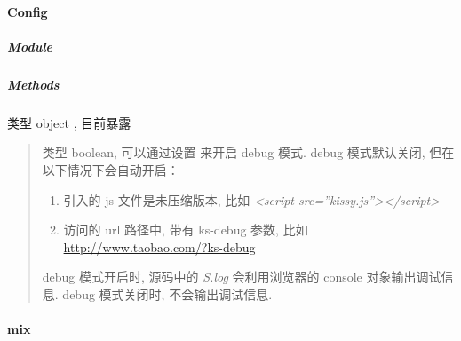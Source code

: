 \documentclass[letterpaper,10pt,english]{sphinxmanual}
\begin{document}
\paragraph{Config}
\label{api/seed/kissy/Config:config}\label{api/seed/kissy/Config::doc}

\subparagraph{Module}
\label{api/seed/kissy/Config:module}\begin{quote}

{\hyperref[api/seed/kissy/index:module-Seed]{}}
\end{quote}


\subparagraph{Methods}
\label{api/seed/kissy/Config:methods}

\begin{fulllineitems}
\label{api/seed/kissy/Config:Seed.KISSY.Config}
类型 object , 目前暴露
\begin{quote}


\begin{fulllineitems}
\label{api/seed/kissy/Config:Seed.KISSY.Config.debug}
类型 boolean, 可以通过设置  来开启 debug 模式.
debug 模式默认关闭, 但在以下情况下会自动开启：
\begin{enumerate}
\item {}
引入的 js 文件是未压缩版本, 比如 \emph{\textless{}script src=''kissy.js''\textgreater{}\textless{}/script\textgreater{}}

\item {}
访问的 url 路径中, 带有 ks-debug 参数, 比如 \href{http://www.taobao.com/?ks-debug}{http://www.taobao.com/?ks-debug}

\end{enumerate}

debug 模式开启时, 源码中的 \emph{S.log} 会利用浏览器的 console 对象输出调试信息.
debug 模式关闭时, 不会输出调试信息.

\end{fulllineitems}

\end{quote}

\end{fulllineitems}



\paragraph{mix}
\label{api/seed/kissy/mix:mix}\label{api/seed/kissy/mix::doc}
\end{document}
